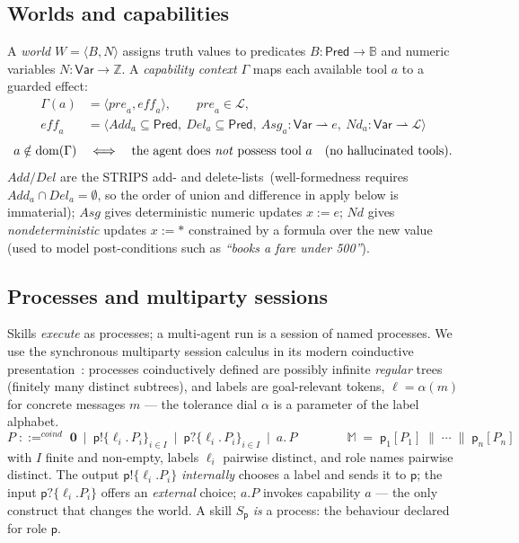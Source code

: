 \documentclass{article}
\theoremstyle{plain}
\theoremstyle{definition}
\newcommand{\Pred}{\mathsf{Pred}}
\newcommand{\Var}{\mathsf{Var}}
\newcommand{\pre}{\mathit{pre}}
\newcommand{\eff}{\mathit{eff}}
\newcommand{\Add}{\mathit{Add}}
\newcommand{\Del}{\mathit{Del}}
\newcommand{\Asg}{\mathit{Asg}}
\newcommand{\Nd}{\mathit{Nd}}
\newcommand{\apply}{\mathrm{apply}}
\newcommand{\dom}{\mathrm{dom}}
\newcommand{\coind}{\mathrel{::=^{\mathit{coind}}}}
\newcommand{\MM}{\mathbb{M}}
\newcommand{\ppar}{\;\|\;}
\def \bmr {}
\def \emr {}
\def \emc {}
\def \bgc {}
\def \egc {}
\begin{document}
\subsection{Worlds and capabilities}\label{sec:capabilities}
A \emph{world} $W=\langle B,N\rangle$ assigns truth values to predicates
$B:\Pred\to\mathbb B$ and
numeric variables $N:\Var\to\mathbb Z$. A \emph{capability context} $\Gamma$ maps
each available tool $a$ to a guarded effect:
\begin{align*}
\Gamma(a)&=\langle \pre_a,\eff_a\rangle,\qquad \pre_a\in\mathcal L,\\
\eff_a&=\langle \Add_a\subseteq\Pred,\ \Del_a\subseteq\Pred,\
\Asg_a:\Var\rightharpoonup e,\ \Nd_a:\Var\rightharpoonup\mathcal L\rangle
\end{align*}
\[
a\notin\dom(\Gamma)\quad\Longleftrightarrow\quad\text{the agent does \emph{not}
possess tool }a\quad(\text{no hallucinated tools}).
\]
$\Add/\Del$ are the STRIPS add- and delete-lists\bgc\ (well-formedness requires
$\Add_a\cap\Del_a=\emptyset$, so the order of union and difference in
$\apply$ below is immaterial)\egc; $\Asg$ gives deterministic
numeric updates $x:=e$; $\Nd$ gives \emph{nondeterministic} updates $x:=\ast$
constrained by a formula over the new value (used to model post-conditions such as
\emph{``books a fare under 500''}).

\subsection{Processes and multiparty sessions}
\label{sec:processes}
Skills \emph{execute} as processes; a multi-agent run is a session of named
processes. We use the synchronous multiparty session calculus in its modern
coinductive \bmr presentation~\cite{synthetic2023,synthetic2026}: %
processes coinductively defined are possibly infinite \emph{regular}
trees (finitely many distinct subtrees), \emr %
and labels are %
goal-relevant tokens,
$\ell=\alpha(m)$ for concrete messages $m$ --- the tolerance dial $\alpha$ is a
parameter of the label alphabet.
\[
P \;\coind\; \mathbf{0}
  \ \mid\ \mathsf{p}!\{\ell_i.\,P_i\}_{i\in I}
  \ \mid\ \mathsf{p}?\{\ell_i.\,P_i\}_{i\in I}
  \ \mid\ a.\,P
\qquad\qquad
\MM \;=\; \mathsf{p}_1[P_1] \ppar \cdots \ppar \mathsf{p}_n[P_n]
\]
with $I$ finite and non-empty, labels $\ell_i$ pairwise distinct, and \bmr role \emr %
names pairwise distinct. The output $\mathsf{p}!\{\ell_i.P_i\}$
\emph{internally} chooses a label and sends it to $\mathsf p$; the input
$\mathsf{p}?\{\ell_i.P_i\}$ offers an \emph{external} choice; $a.P$ invokes
capability $a$ --- the only construct that changes the world. 
A skill $S_{\mathsf p}$ \emph{is} a process: the behaviour declared for role
$\mathsf p$.
\end{document}
